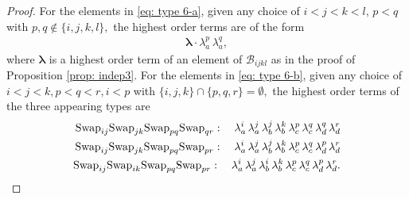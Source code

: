 \documentclass[12pt,dvipsnames,accepted=2016-08-18,a4paper,onecolumn]{quantumarticle}
\numberwithin{equation}{section}
\theoremstyle{definition}
\begin{document}
\begin{proof}
	
	For the elements in \eqref{eq: type 6-a}, given any choice of $i < j < k < l,\, p<q$ with $p,q \notin \{i,j,k,l\},$ the highest order terms are of the form
	\begin{align*}
		\boldsymbol{\lambda} \cdot \lambda_a^p\, \lambda_a^q,
	\end{align*}
	where $\boldsymbol{\lambda}$ is a highest order term of an element of $\mathcal{B}_{ijkl}$ as in the proof of Proposition \ref{prop: indep3}.
	For the elements in \eqref{eq: type 6-b}, given any choice of $i < j < k, p<q<r, i<p$ with $\{i,j,k\} \cap \{p,q,r\} = \emptyset,$ the highest order terms of the three appearing types are
	\begin{align*}
		\textnormal{Swap}_{ij} \textnormal{Swap}_{jk} \textnormal{Swap}_{pq} \textnormal{Swap}_{qr}: \quad  
		\lambda_a^i\, \lambda_a^j\, \lambda_b^j\, \lambda_b^k\, \lambda_c^p\, \lambda_c^q\, \lambda_d^q\, \lambda_d^r\\
		\textnormal{Swap}_{ij} \textnormal{Swap}_{jk} \textnormal{Swap}_{pq} \textnormal{Swap}_{pr}: \quad  
		\lambda_a^i\, \lambda_a^j\, \lambda_b^j\, \lambda_b^k\, \lambda_c^p\, \lambda_c^q\, \lambda_d^p\, \lambda_d^r\\
		\textnormal{Swap}_{ij} \textnormal{Swap}_{ik} \textnormal{Swap}_{pq} \textnormal{Swap}_{pr}: \quad  
		\lambda_a^i\, \lambda_a^j\, \lambda_b^i\, \lambda_b^k\, \lambda_c^p\, \lambda_c^q\, \lambda_d^p\, \lambda_d^r.
	\end{align*}




\end{proof}
\end{document}
